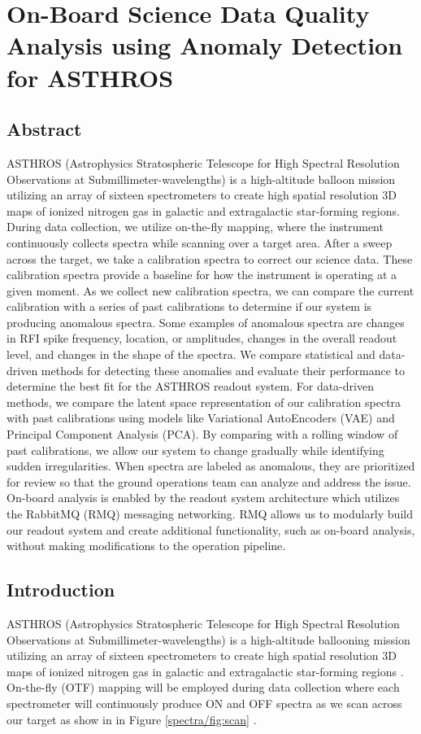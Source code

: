 \chapter[On-Board Science Data Quality Analysis using Anomaly Detection for ASTHROS]{On-Board Science Data Quality Analysis using Anomaly Detection for ASTHROS}
\section{Abstract}
ASTHROS (Astrophysics Stratospheric Telescope for High Spectral Resolution Observations at Submillimeter-wavelengths) is a high-altitude balloon mission utilizing an array of sixteen spectrometers to create high spatial resolution 3D maps of ionized nitrogen gas in galactic and extragalactic star-forming regions.
During data collection, we utilize on-the-fly mapping, where the instrument continuously collects spectra while scanning over a target area.
After a sweep across the target, we take a calibration spectra to correct our science data.
These calibration spectra provide a baseline for how the instrument is operating at a given moment.
As we collect new calibration spectra, we can compare the current calibration with a series of past calibrations to determine if our system is producing anomalous spectra.
Some examples of anomalous spectra are changes in RFI spike frequency, location, or amplitudes, changes in the overall readout level, and changes in the shape of the spectra.
We compare statistical and data-driven methods for detecting these anomalies and evaluate their performance to determine the best fit for the ASTHROS readout system. For data-driven methods, we compare the latent space representation of our calibration spectra with past calibrations using models like Variational AutoEncoders (VAE) and Principal Component Analysis (PCA).
By comparing with a rolling window of past calibrations, we allow our system to change gradually while identifying sudden irregularities.
When spectra are labeled as anomalous, they are prioritized for review so that the ground operations team can analyze and address the issue.
On-board analysis is enabled by the readout system architecture which utilizes the RabbitMQ (RMQ) messaging networking.
RMQ allows us to modularly build our readout system and create additional functionality, such as on-board analysis, without making modifications to the operation pipeline. 


\section{Introduction}
ASTHROS (Astrophysics Stratospheric Telescope for High Spectral Resolution Observations at Submillimeter-wavelengths) is a high-altitude ballooning mission utilizing an array of sixteen spectrometers to create high spatial resolution 3D maps of ionized nitrogen gas in galactic and extragalactic star-forming regions \parencite{siles2020asthros}. 
On-the-fly (OTF) mapping will be employed during data collection where each spectrometer will continuously produce ON and OFF spectra as we scan across our target as show in in Figure \ref{spectra/fig:scan} \parencite{mangum2007fly}. 

